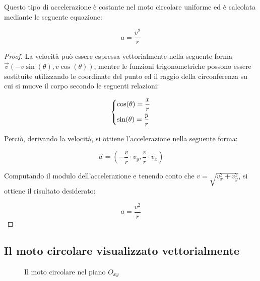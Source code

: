 \documentclass[oneside]{book}
\begin{document}
Questo tipo di accelerazione è costante nel moto circolare uniforme
ed è calcolata mediante le seguente equazione:

\begin{equation}
    a=\frac{v^2}{r}
    \label{eq:acc_c}
\end{equation}

\begin{proof}
La velocità può essere espressa vettorialmente nella seguente
forma $\vec{v}(-v\sin(\theta),v\cos(\theta))$, mentre
le funzioni trigonometriche possono essere sostituite utilizzando
le coordinate del punto ed il raggio della circonferenza su cui
si muove il corpo secondo le seguenti relazioni:

\begin{equation*}
    \begin{dcases}
        \cos(\theta)=\frac{x}{r} \\
        \sin(\theta)=\frac{y}{r}
    \end{dcases}
\end{equation*}

Perciò, derivando la velocità, si ottiene l'accelerazione
nella seguente forma:

\begin{equation*}
    \vec{a}=(-\frac{v}{r}\cdot v_y, \frac{v}{r}\cdot v_x)
\end{equation*}

Computando il modulo dell'accelerazione e tenendo
conto che $v=\sqrt{v_x^2+v_y^2}$, si ottiene
il risultato desiderato:

\begin{equation*}
    a=\frac{v^2}r
\end{equation*}

\end{proof}

\newpage

\subsection{Il moto circolare visualizzato vettorialmente}

\vskip 0.1in

\begin{wrapfigure}{l}{0.45\textwidth}
    \caption{Il moto circolare nel piano $O_{xy}$} \label{fig:moto_circolare}
\end{wrapfigure}
\end{document}
